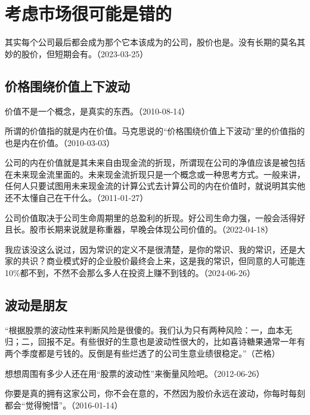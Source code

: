 
\section{考虑市场很可能是错的}

其实每个公司最后都会成为那个它本该成为的公司，股价也是。没有长期的莫名其妙的股价，但短期会有。（2023-03-25）

\subsection{价格围绕价值上下波动}

价值不是一个概念，是真实的东西。（2010-08-14）

所谓的价值指的就是内在价值。马克思说的“价格围绕价值上下波动”里的价值指的也是内在价值。（2010-03-03）

公司的内在价值就是其未来自由现金流的折现，所谓现在公司的净值应该是被包括在未来现金流里面的。未来现金流折现只是一个概念或一种思考方式。一般来讲，任何人只要试图用未来现金流的计算公式去计算公司的内在价值时，就说明其实他还不太懂自己在干什么。（2011-01-27）

公司价值取决于公司生命周期里的总盈利的折现。好公司生命力强，一般会活得好且长。股市长期来说就是称重器，早晚会体现公司价值的。（2022-04-18）


我应该没这么说过，因为常识的定义不是很清楚，是你的常识、我的常识，还是大家的共识？商业模式好的企业股价最终会上来，这是我的常识，但同意的人可能连10\%都不到，不然不会那么多人在投资上赚不到钱的。（2024-06-26）

\subsection{波动是朋友}

“根据股票的波动性来判断风险是很傻的。我们认为只有两种风险：一，血本无归；二，回报不足。有些很好的生意也是波动性很大的，比如喜诗糖果通常一年有两个季度都是亏钱的。反倒是有些烂透了的公司生意业绩很稳定。”（芒格）

想想周围有多少人还在用“股票的波动性”来衡量风险吧。（2012-06-26）


你要是真的拥有这家公司，你不会在意的，不然因为股价永远在波动，你每时每刻都会“觉得惋惜”。（2016-01-14）

